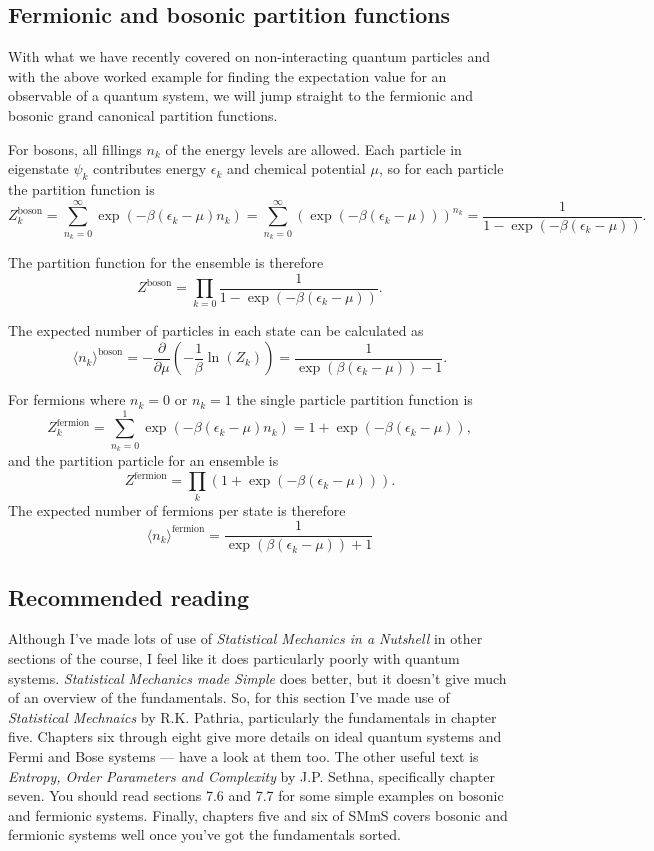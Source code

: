 \documentclass{article}
\begin{document}
\subsection{Fermionic and bosonic partition functions}
With what we have recently covered on non-interacting quantum particles and with the above worked example for finding the expectation value for an observable of a quantum system, we will jump straight to the fermionic and bosonic grand canonical partition functions.

For bosons, all fillings $n_k$ of the energy levels are allowed. Each particle in eigenstate $\psi_k$ contributes energy $\epsilon_k$ and chemical potential $\mu$, so for each particle the partition function is
$$
	Z_k^\text{boson} = \sum_{n_k=0}^\infty\exp(-\beta(\epsilon_k-\mu)n_k) = \sum_{n_k=0}^\infty\left(\exp(-\beta(\epsilon_k-\mu))\right)^{n_k} = \frac{1}{1-\exp(-\beta(\epsilon_k-\mu))}.
$$

The partition function for the ensemble is therefore
$$
	Z^\text{boson} = \prod_{k=0} \frac{1}{1-\exp(-\beta(\epsilon_k-\mu))}.
$$

The expected number of particles in each state can be calculated as
$$
	\langle n_k \rangle^\text{boson} = -\frac{\partial}{\partial \mu}(-\frac{1}{\beta}\ln(Z_k)) = \frac{1}{\exp(\beta(\epsilon_k-\mu))-1}.
$$


For fermions where $n_k=0$ or $n_k=1$ the single particle partition function is
$$
	Z_k^\text{fermion} = \sum_{n_k=0}^1 \exp(-\beta(\epsilon_k-\mu)n_k) = 1 + \exp(-\beta(\epsilon_k-\mu)),
$$
and the partition particle for an ensemble is
$$
	Z^\text{fermion} = \prod_k(1+ \exp(-\beta(\epsilon_k-\mu))).
$$
The expected number of fermions per state is therefore
$$
		\langle n_k \rangle^\text{fermion} = \frac{1}{\exp(\beta(\epsilon_k-\mu))+1}
$$


\subsection{Recommended reading}
Although I've made lots of use of \emph{Statistical Mechanics in a Nutshell} in other sections of the course, I feel like it does particularly poorly with quantum systems. \emph{Statistical Mechanics made Simple} does better, but it doesn't give much of an overview of the fundamentals. So, for this section I've made use of \emph{Statistical Mechnaics} by R.K. Pathria, particularly the fundamentals in chapter five. Chapters six through eight give more details on ideal quantum systems and Fermi and Bose systems --- have a look at them too. The other useful text is \emph{Entropy, Order Parameters and Complexity} by J.P. Sethna, specifically chapter seven.  You should read sections 7.6 and 7.7 for some simple examples on bosonic and fermionic systems. Finally, chapters five and six of SMmS covers bosonic and fermionic systems well once you've got the fundamentals sorted.
\end{document}
